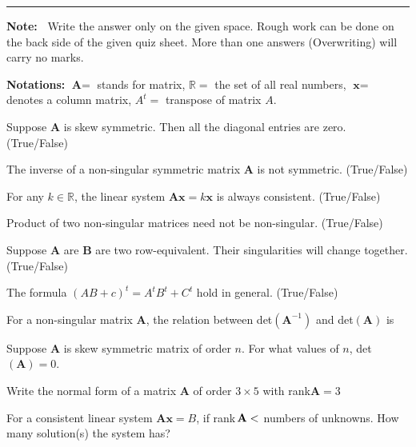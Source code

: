 \documentclass[12pt]{examdesign}
\begin{document}
\begin{exampreface}
\hrule
\vspace{0.5cm}
{\noindent \bf Note:~}
Write the answer only on the given space. Rough work can be done on the back side of the given quiz sheet. More than one answers (Overwriting) will carry no marks.
\end{exampreface}
\begin{examclosing}
{\bf Notations:} $\textbf{A}=$ stands for matrix,  $\mathbb{R}=$ the set of all real numbers,  $\textbf{x}=$ denotes a column matrix, $A^t=$ transpose of matrix $A$.
\end{examclosing}

\begin{fillin}[title={~},suppressprefix]
\begin{question}
Suppose $\textbf{A}$ is skew symmetric. Then all the diagonal entries are zero. (True/False) 
\end{question}
\begin{question}
The inverse of a non-singular symmetric matrix $\textbf{A}$ is not symmetric. (True/False) 
\end{question}
\begin{question}
For any $k\in \mathbb R$, the linear system $\textbf{Ax}=k\textbf{x}$ is always consistent. (True/False) 
\end{question}

\begin{question}
Product of two non-singular matrices need not be non-singular. (True/False) 
\end{question}

\begin{question}
Suppose $\textbf{A}$ are $\textbf{B}$ are two row-equivalent. Their singularities will change together. (True/False) 
\end{question}

\begin{question}
The formula \;$(AB+c)^t=A^tB^t+C^t$\; hold in general. (True/False) 
\end{question}
\begin{question}
  For a non-singular matrix $\textbf{A}$, the relation between\; det$(\textbf{A}^{-1})$ and det$(\textbf{A})$  is 
\end{question}
\begin{question}
Suppose $\textbf{A}$ is skew symmetric matrix of order $n$. For what values of $n$, \;det$(\textbf{A})=0$. 
\end{question}
\begin{question}
 Write the normal form of a matrix $\textbf{A}$ of order $3\times 5$ with rank$\textbf{A}=3$ 
\end{question}
\begin{question}
 For a consistent linear system $\textbf{Ax}={B}$, if \;rank$\,{\bf A}<$ numbers of unknowns. How many solution(s) the system has? 
\end{question}
\end{fillin}
\end{document}
